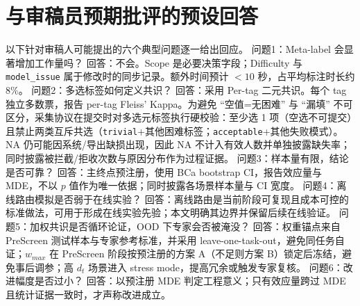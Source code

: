 ﻿\section{与审稿员预期批评的预设回答}

以下针对审稿人可能提出的六个典型问题逐一给出回应。
问题1：Meta-label 会显著增加工作量吗？
回答：不会。Scope 是必要决策字段；Difficulty 与 \texttt{model\_issue} 属于修改时的同步记录。额外时间预计 $<10$ 秒，占平均标注时长约 8\%。
问题2：多选标签如何定义共识？
回答：采用 Per-tag 二元共识。每个 tag 独立多数票，报告 per-tag Fleiss' Kappa。为避免 ``空值=无困难'' 与 ``漏填'' 不可区分，采集协议在提交时对多选元标签执行硬校验：至少选 1 项（空选不可提交）且禁止两类互斥共选（\texttt{trivial}+其他困难标签；\texttt{acceptable}+其他失败模式）。NA 仍可能因系统/导出缺损出现，因此 NA 不计入有效人数并单独披露缺失率；同时披露被拦截/拒收次数与原因分布作为过程证据。
问题3：样本量有限，结论是否可靠？
回答：主终点预注册，使用 BCa bootstrap CI，报告效应量与 MDE，不以 $p$ 值作为唯一依据；同时披露各场景样本量与 CI 宽度。
问题4：离线路由模拟是否弱于在线实验？
回答：离线路由是当前阶段可复现且成本可控的标准做法，可用于形成在线实验先验；本文明确其边界并保留后续在线验证。
问题5：加权共识是否循环论证，OOD 下专家会否被淹没？
回答：权重锚点来自 PreScreen 测试样本与专家参考标准，并采用 leave-one-task-out，避免同任务自证；$w_{max}$ 在 PreScreen 阶段按预注册的方案 A（不足则方案 B）锁定后冻结，避免事后调参；高 $d_{t}$ 场景进入 stress mode，提高冗余或触发专家复核。
问题6：改进幅度是否过小？
回答：以预注册 MDE 判定工程意义；只有效应量跨过 MDE 且统计证据一致时，才声称改进成立。


